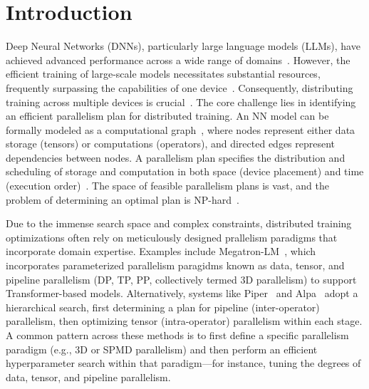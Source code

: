 \documentclass[letterpaper,twocolumn,10pt]{article}
\begin{document}
\vspace{-0.5em}
\section{Introduction}
\label{sec:intro}

Deep Neural Networks (DNNs), particularly large language models (LLMs), have achieved advanced performance across a wide range of domains~\cite{deepseekai2025deepseekr1, openai2024gpt4, brown2020language, silver2017mastering}. However, the efficient training of large-scale models necessitates substantial resources, frequently surpassing the capabilities of one device~\cite{narayanan2021efficient}. Consequently, distributing training across multiple devices is crucial~\cite{duan2024efficient, athlur2022varuna}. The core challenge lies in identifying an efficient parallelism plan for distributed training. An NN model can be formally modeled as a computational graph~\cite{lin2023songc}, where nodes represent either data storage (tensors) or computations (operators), and directed edges represent dependencies between nodes. A parallelism plan specifies the distribution and scheduling of storage and computation in both space (device placement) and time (execution order)~\cite{qiu2025moirai, huang2019yugong, lin2024nnscaler, xu2021gspmd}. The space of feasible parallelism plans is vast, and the problem of determining an optimal plan is NP-hard~\cite{liu2024aceso}.

Due to the immense search space and complex constraints, distributed training optimizations often rely on meticulously designed prallelism paradigms that incorporate domain expertise. Examples include Megatron-LM~\cite{shoeybi2019megatron, narayanan2021efficient}, which incorporates parameterized parallelism paragidms known as data, tensor, and pipeline parallelism (DP, TP, PP, collectively termed 3D parallelism) to support Transformer-based models. Alternatively, systems like Piper~\cite{tarnawski2021piper} and Alpa~\cite{zheng2022alpa} adopt a hierarchical search, first determining a plan for pipeline (inter-operator) parallelism, then optimizing tensor (intra-operator) parallelism within each stage. A common pattern across these methods is to first define a specific parallelism paradigm (e.g., 3D or SPMD parallelism) and then perform an efficient hyperparameter search within that paradigm—for instance, tuning the degrees of data, tensor, and pipeline parallelism.
\end{document}
